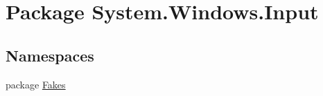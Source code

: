\hypertarget{namespace_system_1_1_windows_1_1_input}{\section{Package System.\-Windows.\-Input}
\label{namespace_system_1_1_windows_1_1_input}
}
\subsection*{Namespaces}
\begin{DoxyCompactItemize}
\item 
package \hyperlink{namespace_system_1_1_windows_1_1_input_1_1_fakes}{Fakes}
\end{DoxyCompactItemize}
